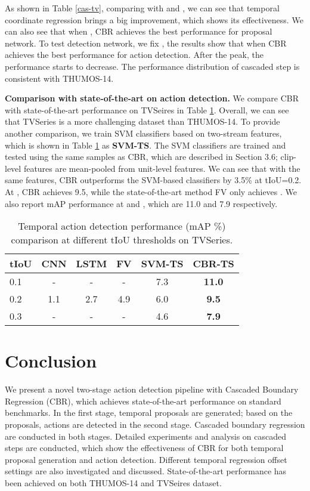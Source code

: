 \documentclass{bmvc2k}
\begin{document}
As shown in Table \ref{cas-tv}, comparing with  and , we can see that temporal coordinate regression brings a big improvement, which shows its effectiveness. We can also see that when , CBR achieves the best performance for proposal network. To test detection network, we fix , the results show that when   CBR achieves the best performance for action detection. After the peak, the performance starts to decrease. The performance distribution of cascaded step is consistent with THUMOS-14.   


\textbf{Comparison with state-of-the-art on action detection.} We compare CBR with state-of-the-art performance on TVSeires in Table \ref{tv-det}. Overall, we can see that TVSeries is a more challenging dataset than THUMOS-14. To provide another comparison, we train SVM classifiers based on two-stream features, which is shown in Table \ref{tv-det} as \textbf{SVM-TS}. The SVM classifiers are trained and tested using the same samples as CBR, which are described in Section 3.6; clip-level features are mean-pooled from unit-level features. We can see that with the same features, CBR outperforms the SVM-based classifiers by 3.5\% at tIoU=0.2.  At , CBR achieves 9.5, while the state-of-the-art method FV \cite{de2016online} only achieves . We also report mAP performance at  and , which are 11.0 and 7.9 respectively.

\begin{table}[h]\small
\centering
\caption{Temporal action detection performance (mAP \%) comparison at different tIoU thresholds on TVSeries.}
\label{tv-det}
\begin{tabular}{l|ccccc}
\hline
tIoU     & CNN \cite{de2016online}           & LSTM \cite{de2016online}           & FV  \cite{de2016online}     & SVM-TS & CBR-TS         \\ \hline
 0.1 & -          & -          & -     & 7.3&       \textbf{11.0}     \\ 
 0.2 &1.1          & 2.7          & 4.9   & 6.0 &      \textbf{9.5}     \\ 
  0.3 & -          & -          & -      &4.6 &      \textbf{7.9}    \\ \hline
\end{tabular}
\end{table}

\section{Conclusion}
We present a novel two-stage action detection pipeline with Cascaded Boundary Regression (CBR), which achieves state-of-the-art performance on standard benchmarks. In the first stage, temporal proposals are generated; based on the proposals, actions are detected in the second stage. Cascaded boundary regression are conducted in both stages. Detailed experiments and analysis on cascaded steps are conducted, which show the effectiveness of CBR for both temporal proposal generation and action detection. Different temporal regression offset settings are also investigated and discussed. State-of-the-art performance has been achieved on both THUMOS-14 and TVSeires dataset.


\end{document}
